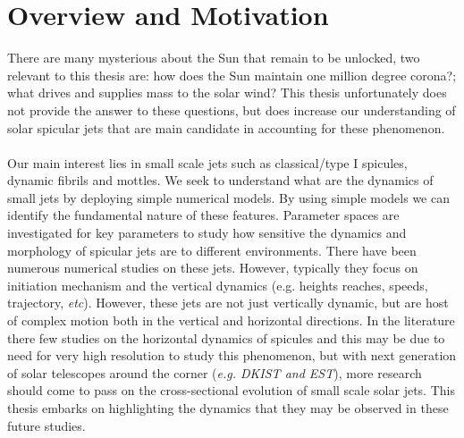 \documentclass[12pt]{ociamthesis}
\newcommand{\np}{\\ \\}
\begin{document}
\section{Overview and Motivation}
\label{sec:overview}
There are many mysterious about the Sun that remain to be unlocked, two relevant to this thesis are: how does the Sun maintain one million degree corona?; what drives and supplies mass to the solar wind? This thesis unfortunately does not provide the answer to these questions, but does increase our understanding of solar spicular jets that are main candidate in accounting for these phenomenon. \np 
%
Our main interest lies in small scale jets such as classical/type I spicules, dynamic fibrils and mottles. We seek to understand what are the dynamics of small jets by deploying simple numerical models. By using simple models we can identify the fundamental nature of these features. Parameter spaces are investigated for key parameters to study how sensitive the dynamics and morphology of spicular jets are to different environments. There have been numerous numerical studies on these jets. However, typically they focus on initiation mechanism and the vertical dynamics (e.g. heights reaches, speeds, trajectory, \textit{etc}). However, these jets are not just vertically dynamic, but are host of complex motion both in the vertical and horizontal directions. In the literature there few studies on the horizontal dynamics of spicules and this may be due to need for very high resolution to study this phenomenon, but with next generation of solar telescopes around the corner (\textit{e.g. DKIST and EST}), more research should come to pass on the cross-sectional evolution of small scale solar jets. This thesis embarks on highlighting the dynamics that they may be observed in these future studies.
\end{document}
